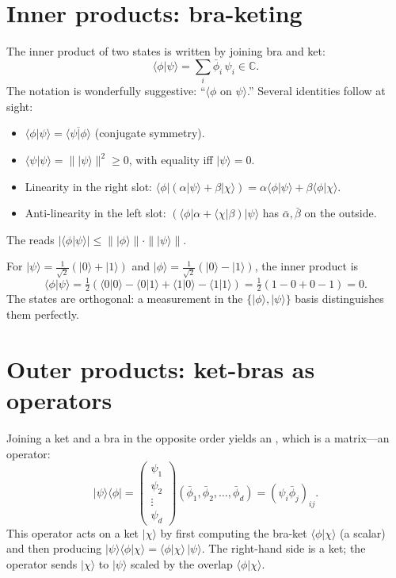 \section{Inner products: bra-keting}

The inner product of two states is written by joining bra and ket:
\[
  \langle\phi|\psi\rangle = \sum_i \bar{\phi}_i\,\psi_i \in \mathbb{C}.
\]
The notation is wonderfully suggestive: ``$\langle\phi$ on $\psi\rangle$.'' Several identities follow at sight:
\begin{itemize}
  \item $\langle\phi|\psi\rangle = \overline{\langle\psi|\phi\rangle}$ (conjugate symmetry).
  \item $\langle\psi|\psi\rangle = \||\psi\rangle\|^2 \geq 0$, with equality iff $|\psi\rangle = 0$.
  \item Linearity in the right slot: $\langle\phi|(\alpha|\psi\rangle + \beta|\chi\rangle) = \alpha\langle\phi|\psi\rangle + \beta\langle\phi|\chi\rangle$.
  \item Anti-linearity in the left slot: $(\langle\phi|\alpha + \langle\chi|\beta)|\psi\rangle$ has $\bar\alpha,\bar\beta$ on the outside.
\end{itemize}
The  reads $|\langle\phi|\psi\rangle| \leq \||\phi\rangle\|\cdot\||\psi\rangle\|$.

\begin{example}
For $|\psi\rangle = \tfrac{1}{\sqrt 2}(|0\rangle + |1\rangle)$ and $|\phi\rangle = \tfrac{1}{\sqrt 2}(|0\rangle - |1\rangle)$, the inner product is
\[
  \langle\phi|\psi\rangle = \tfrac{1}{2}(\langle 0|0\rangle - \langle 0|1\rangle + \langle 1|0\rangle - \langle 1|1\rangle) = \tfrac{1}{2}(1-0+0-1) = 0.
\]
The states are orthogonal: a measurement in the $\{|\phi\rangle,|\psi\rangle\}$ basis distinguishes them perfectly.
\end{example}

\section{Outer products: ket-bras as operators}

Joining a ket and a bra in the opposite order yields an , which is a matrix---an operator:
\[
  |\psi\rangle\langle\phi| = \begin{pmatrix} \psi_1 \\ \psi_2 \\ \vdots \\ \psi_d \end{pmatrix} (\bar\phi_1,\bar\phi_2,\ldots,\bar\phi_d) = (\psi_i \bar\phi_j)_{ij}.
\]
This operator acts on a ket $|\chi\rangle$ by first computing the bra-ket $\langle\phi|\chi\rangle$ (a scalar) and then producing $|\psi\rangle\langle\phi|\chi\rangle = \langle\phi|\chi\rangle\,|\psi\rangle$. The right-hand side is a ket; the operator sends $|\chi\rangle$ to $|\psi\rangle$ scaled by the overlap $\langle\phi|\chi\rangle$.

